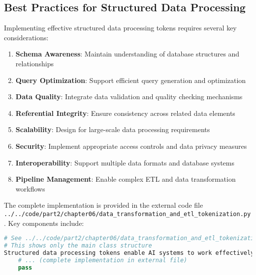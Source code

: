 \subsection{Best Practices for Structured Data Processing}

Implementing effective structured data processing tokens requires several key considerations:

\begin{enumerate}
\item \textbf{Schema Awareness}: Maintain understanding of database structures and relationships
\item \textbf{Query Optimization}: Support efficient query generation and optimization
\item \textbf{Data Quality}: Integrate data validation and quality checking mechanisms
\item \textbf{Referential Integrity}: Ensure consistency across related data elements
\item \textbf{Scalability}: Design for large-scale data processing requirements
\item \textbf{Security}: Implement appropriate access controls and data privacy measures
\item \textbf{Interoperability}: Support multiple data formats and database systems
\item \textbf{Pipeline Management}: Enable complex ETL and data transformation workflows
\end{enumerate}
The complete implementation is provided in the external code file \texttt{../../code/part2/chapter06/data\_transformation\_and\_etl\_tokenization.py}. Key components include:

\begin{lstlisting}[language=Python, caption=Core structure (see external file for complete implementation)]
# See ../../code/part2/chapter06/data_transformation_and_etl_tokenization.py for the complete implementation
# This shows only the main class structure
Structured data processing tokens enable AI systems to work effectively with databases, data warehouses, and complex data processing pipelines, supporting automated database design, query optimization, and intelligent data transformation while maintaining data integrity and performance requirements.
    # ... (complete implementation in external file)
    pass
\end{lstlisting}